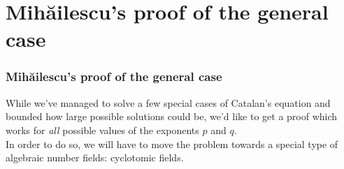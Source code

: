 \section{Mihăilescu's proof of the general case}

\begin{frame}
\frametitle{Mihăilescu's proof of the general case}

While we've managed to solve a few special cases of Catalan's equation and bounded how large possible solutions could be, we'd like to get a proof which works for \emph{all} possible values of the exponents \(p\) and \(q\). \\[1em]

In order to do so, we will have to move the problem towards a special type of algebraic number fields: cyclotomic fields.
\end{frame}





